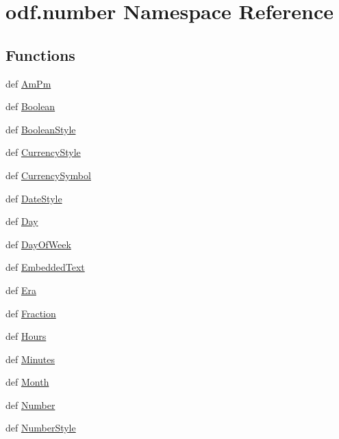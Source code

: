 \hypertarget{namespaceodf_1_1number}{\section{odf.\+number Namespace Reference}
\label{namespaceodf_1_1number}
}
\subsection*{Functions}
\begin{DoxyCompactItemize}
\item 
def \hyperlink{namespaceodf_1_1number_aea7dbe37b23a78f99229d4470b4fd387}{Am\+Pm}
\item 
def \hyperlink{namespaceodf_1_1number_a52f412f2505fb4b7f9bc850baf5c09a0}{Boolean}
\item 
def \hyperlink{namespaceodf_1_1number_af5e0e7f6c98f62e21f0e71010f5aa563}{Boolean\+Style}
\item 
def \hyperlink{namespaceodf_1_1number_ac6b4d66af1b244f0eb18d78e8e005e74}{Currency\+Style}
\item 
def \hyperlink{namespaceodf_1_1number_a00794cb7b8d2fcc4d02abaf1779e71ae}{Currency\+Symbol}
\item 
def \hyperlink{namespaceodf_1_1number_ab42d20ae70cc68d268f68ddc16a1d149}{Date\+Style}
\item 
def \hyperlink{namespaceodf_1_1number_af55f319c7eadc936fc284fbe5fd38176}{Day}
\item 
def \hyperlink{namespaceodf_1_1number_a91bde3f4fdaee80ac82101bce6b04e42}{Day\+Of\+Week}
\item 
def \hyperlink{namespaceodf_1_1number_a584d0f2f580d89758a64c7a12cac00ba}{Embedded\+Text}
\item 
def \hyperlink{namespaceodf_1_1number_a5470f463bae52c7e0e6df56eb4b50f98}{Era}
\item 
def \hyperlink{namespaceodf_1_1number_a75db68268c51f6d01055af520bd125a7}{Fraction}
\item 
def \hyperlink{namespaceodf_1_1number_a68a3e593b38c22a4bcec37149452b9ef}{Hours}
\item 
def \hyperlink{namespaceodf_1_1number_a6ec941c8ffd5ce304f089522b9963e09}{Minutes}
\item 
def \hyperlink{namespaceodf_1_1number_a98b22595051a38103bce0d8ff3ec6b31}{Month}
\item 
def \hyperlink{namespaceodf_1_1number_a8ef64aa6b0a897ee0126227ceb7b6347}{Number}
\item 
def \hyperlink{namespaceodf_1_1number_a3de4c489058b4321d042bcc04127dcb6}{Number\+Style}

\end{DoxyCompactItemize}
